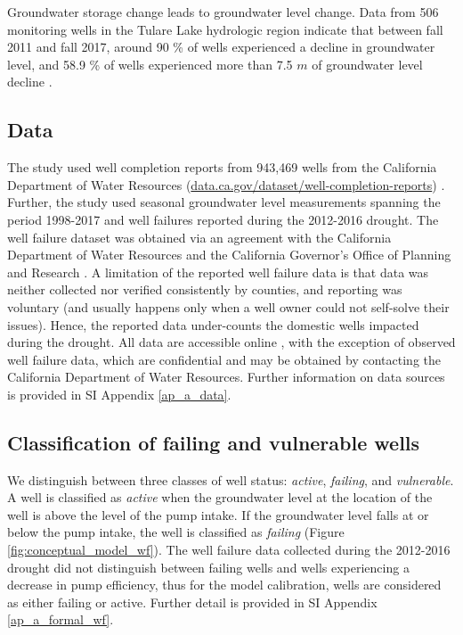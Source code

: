 Groundwater storage change leads to groundwater level change. Data from 506 monitoring wells in the Tulare Lake hydrologic region indicate that between fall 2011 and fall 2017, around 90 \% of wells experienced a decline in groundwater level, and 58.9 \% of wells experienced more than 7.5 $m$ of groundwater level decline \citep{dwrgwl2017}. 



\subsection{Data}
The study used well completion reports from 943,469 wells from the California Department of Water Resources (\hyperlink{https://data.ca.gov/dataset/well-completion-reports}{data.ca.gov/dataset/well-completion-reports}) \citep{oswcr}. Further, the study used seasonal groundwater level measurements \citep{gwl} spanning the period 1998-2017 and well failures reported during the 2012-2016 drought. The well failure dataset was obtained via an agreement with the California Department of Water Resources and the California Governor's Office of Planning and Research \citep{observedDW}. A limitation of the reported well failure data is that data was neither collected nor verified consistently by counties, and reporting was voluntary (and usually happens only when a well owner could not self-solve their issues). Hence, the reported data under-counts the domestic wells impacted during the drought. All data are accessible online \citep{Pauloo2019}, with the exception of observed well failure data, which are confidential and may be obtained by contacting the California Department of Water Resources. Further information on data sources is provided in SI Appendix \ref{ap_a_data}.

\subsection{Classification of failing and vulnerable wells}

We distinguish between three classes of well status: \textit{active}, \textit{failing}, and \textit{vulnerable}. A well is classified as \textit{active} when the groundwater level at the location of the well is above the level of the pump intake. If the groundwater level falls at or below the pump intake, the well is classified as \textit{failing} (Figure \ref{fig:conceptual_model_wf}). The well failure data collected during the 2012-2016 drought did not distinguish between failing wells and wells experiencing a decrease in pump efficiency, thus for the model calibration, wells are considered as either failing or active. Further detail is provided in SI Appendix \ref{ap_a_formal_wf}.

